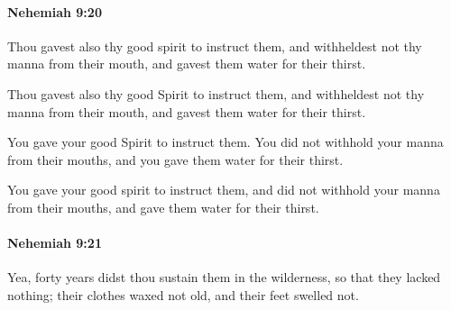 		\paragraph{Nehemiah 9:20} %
			\label{NEHEMIAH-9-20}

			Thou gavest also thy good spirit to instruct them, and withheldest not thy manna from their mouth, and gavest them water for their thirst.

			\begin{versebox}
					\item[BHS] 
					\item[LXX] 
					\item[ASV] Thou gavest also thy good Spirit to instruct them, and withheldest not thy manna from their mouth, and gavest them water for their thirst.
					\item[NIV] You gave your good Spirit to instruct them. You did not withhold your manna from their mouths, and you gave them water for their thirst.
					\item[NRSV] You gave your good spirit to instruct them, and did not withhold your manna from their mouths, and gave them water for their thirst.
			\end{versebox}

		\paragraph{Nehemiah 9:21} %
			\label{NEHEMIAH-9-21}

			Yea, forty years didst thou sustain them in the wilderness, so that they lacked nothing; their clothes waxed not old, and their feet swelled not.

